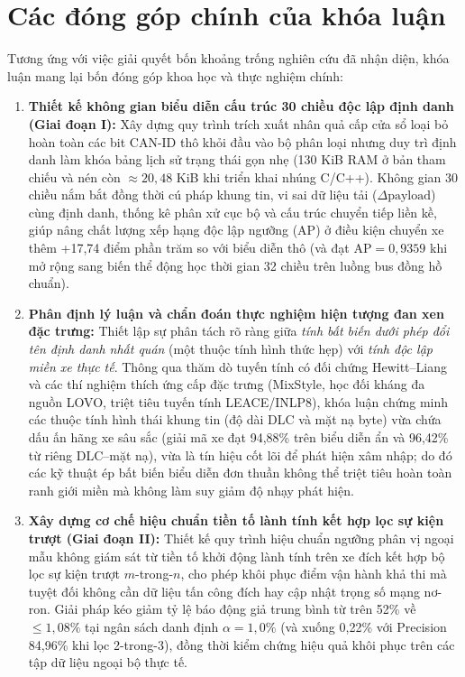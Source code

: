 \documentclass[12pt, a4paper, reqno, oneside]{book}
\newcommand\sect[1]{%
  \Needspace{5\baselineskip}%
  \phantomsection%
  \addcontentsline{toc}{section}{#1}%
  \section*{#1}%
}
\begin{document}
\sect{Các đóng góp chính của khóa luận}
Tương ứng với việc giải quyết bốn khoảng trống nghiên cứu đã nhận diện, khóa luận mang lại bốn đóng góp khoa học và thực nghiệm chính:
\begin{enumerate}
    \item \textbf{Thiết kế không gian biểu diễn cấu trúc 30 chiều độc lập định danh (Giai đoạn I):} Xây dựng quy trình trích xuất nhân quả cấp cửa sổ loại bỏ hoàn toàn các bit CAN-ID thô khỏi đầu vào bộ phân loại nhưng duy trì định danh làm khóa bảng lịch sử trạng thái gọn nhẹ (130 KiB RAM ở bản tham chiếu và nén còn $\approx 20{,}48$ KiB khi triển khai nhúng C/C++). Không gian 30 chiều nắm bắt đồng thời cú pháp khung tin, vi sai dữ liệu tải ($\Delta\text{payload}$) cùng định danh, thống kê phân xử cục bộ và cấu trúc chuyển tiếp liền kề, giúp nâng chất lượng xếp hạng độc lập ngưỡng (AP) ở điều kiện chuyển xe thêm +17,74 điểm phần trăm so với biểu diễn thô (và đạt $\text{AP} = 0{,}9359$ khi mở rộng sang biến thể động học thời gian 32 chiều trên luồng bus đồng hồ chuẩn).
    \item \textbf{Phân định lý luận và chẩn đoán thực nghiệm hiện tượng đan xen đặc trưng:} Thiết lập sự phân tách rõ ràng giữa \textit{tính bất biến dưới phép đổi tên định danh nhất quán} (một thuộc tính hình thức hẹp) với \textit{tính độc lập miền xe thực tế}. Thông qua thăm dò tuyến tính có đối chứng Hewitt--Liang và các thí nghiệm thích ứng cấp đặc trưng (MixStyle, học đối kháng đa nguồn LOVO, triệt tiêu tuyến tính LEACE/INLP8), khóa luận chứng minh các thuộc tính hình thái khung tin (độ dài DLC và mặt nạ byte) vừa chứa dấu ấn hãng xe sâu sắc (giải mã xe đạt 94,88\% trên biểu diễn ẩn và 96,42\% từ riêng DLC--mặt nạ), vừa là tín hiệu cốt lõi để phát hiện xâm nhập; do đó các kỹ thuật ép bất biến biểu diễn đơn thuần không thể triệt tiêu hoàn toàn ranh giới miền mà không làm suy giảm độ nhạy phát hiện.
    \item \textbf{Xây dựng cơ chế hiệu chuẩn tiền tố lành tính kết hợp lọc sự kiện trượt (Giai đoạn II):} Thiết kế quy trình hiệu chuẩn ngưỡng phân vị ngoại mẫu không giám sát từ tiền tố khởi động lành tính trên xe đích kết hợp bộ lọc sự kiện trượt $m$-trong-$n$, cho phép khôi phục điểm vận hành khả thi mà tuyệt đối không cần dữ liệu tấn công đích hay cập nhật trọng số mạng nơ-ron. Giải pháp kéo giảm tỷ lệ báo động giả trung bình từ trên 52\% về $\le 1{,}08\%$ tại ngân sách danh định $\alpha = 1{,}0\%$ (và xuống 0,22\% với Precision 84,96\% khi lọc 2-trong-3), đồng thời kiểm chứng hiệu quả khôi phục trên các tập dữ liệu ngoại bộ thực tế.

\end{enumerate}
\end{document}
